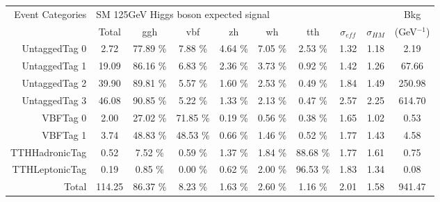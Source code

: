 \begin{tabular}{ |r | c | c | c  | c |  c |  c |  c |  c |  c | }
\hline
\hline
\multirow{2}{*}{Event Categories} &\multicolumn{8}{|l|}{SM 125GeV Higgs boson expected signal} & Bkg \\ \cline{2-9}
               &  Total     & ggh       & vbf       & zh       & wh       & tth       &   $\sigma_{eff} $  & $\sigma_{HM} $ & (GeV$^{-1}$) \\
 \hline                                             
 \hline                                             
UntaggedTag 0  &    2.72    &  77.89 \% &  7.88 \%  &  4.64 \% &  7.05 \% &  2.53 \%  & 1.32 & 1.18 & 2.19   \\
UntaggedTag 1  &    19.09   &  86.16 \% &  6.83 \%  &  2.36 \% &  3.73 \% &  0.92 \%  & 1.42 & 1.26 & 67.66  \\
UntaggedTag 2  &    39.90   &  89.81 \% &  5.57 \%  &  1.60 \% &  2.53 \% &  0.49 \%  & 1.84 & 1.49 & 250.98 \\
UntaggedTag 3  &    46.08   &  90.85 \% &  5.22 \%  &  1.33 \% &  2.13 \% &  0.47 \%  & 2.57 & 2.25 & 614.70 \\
VBFTag 0       &    2.00    &  27.02 \% &  71.85 \% &  0.19 \% &  0.56 \% &  0.38 \%  & 1.65 & 1.02 & 0.53   \\
VBFTag 1       &    3.74    &  48.83 \% &  48.53 \% &  0.66 \% &  1.46 \% &  0.52 \%  & 1.77 & 1.43 &4.58    \\
TTHHadronicTag &    0.52    &  7.52 \%  &  0.59 \%  &  1.37 \% &  1.84 \% &  88.68 \% & 1.77 & 1.61 & 0.75   \\
TTHLeptonicTag &    0.19    &  0.85 \%  &  0.00 \%  &  0.62 \% &  2.00 \% &  96.53 \% & 1.83 & 1.34 & 0.08   \\
Total          &    114.25  &  86.37 \% &  8.23 \%  &  1.63 \% &  2.60 \% &  1.16 \%  & 2.01 & 1.58 & 941.47 \\
\hline
\hline
\end{tabular}
